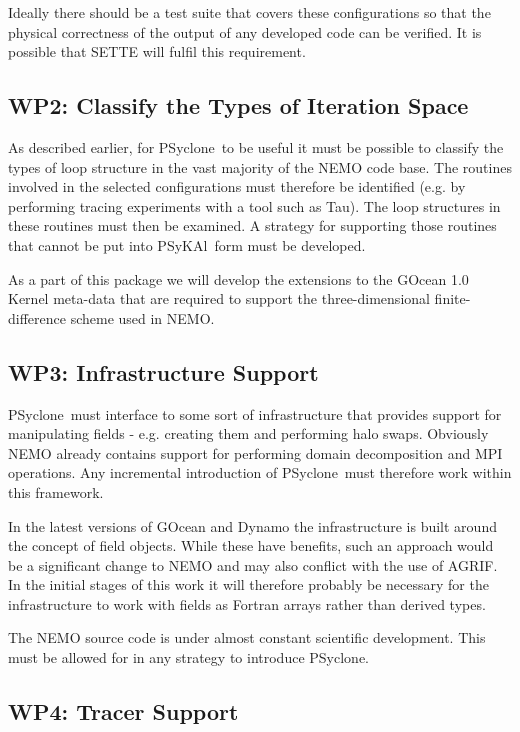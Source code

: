 \documentclass{article}
\newcommand{\psykal}{{PS}y{KA}l}
\newcommand{\psyclone}{{PS}yclone}
\begin{document}
Ideally there should be a test suite that covers these configurations
so that the physical correctness of the output of any developed code
can be verified. It is possible that SETTE will fulfil this
requirement.

\subsection{WP2: Classify the Types of Iteration Space}
\label{wp2_classify}

As described earlier, for \psyclone\ to be useful it must be possible to
classify the types of loop structure in the vast majority of the NEMO
code base. The routines involved in the selected configurations must
therefore be identified (e.g. by performing tracing experiments with a
tool such as Tau). The loop structures in these routines must then be
examined. A strategy for supporting those routines that cannot be put
into \psykal\ form must be developed.

As a part of this package we will develop the extensions to the GOcean
1.0 Kernel meta-data that are required to support the
three-dimensional finite-difference scheme used in NEMO.

\subsection{WP3: Infrastructure Support}
\label{wp3_infrastructure}

\psyclone\ must interface to some sort of infrastructure that provides
support for manipulating fields - e.g. creating them and performing
halo swaps. Obviously NEMO already contains support for performing
domain decomposition and MPI operations. Any incremental introduction
of \psyclone\ must therefore work within this framework.

In the latest versions of GOcean and Dynamo the infrastructure is
built around the concept of field objects. While these have benefits,
such an approach would be a significant change to NEMO and may also
conflict with the use of AGRIF. In the initial stages of this work it
will therefore probably be necessary for the infrastructure to work
with fields as Fortran arrays rather than derived types.

The NEMO source code is under almost constant scientific
development. This must be allowed for in any strategy to introduce
\psyclone.

\subsection{WP4: Tracer Support}
\label{wp4_tracers}
\end{document}
